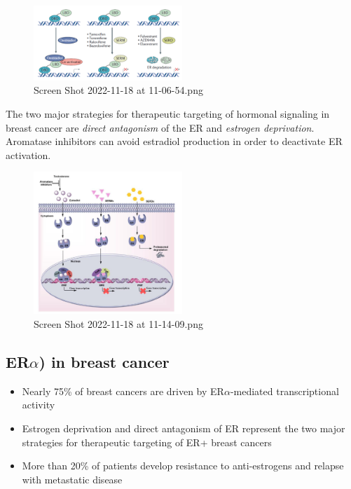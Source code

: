 \begin{figure}
\centering
\includegraphics[width=0.5\textwidth]{../_resources/Screen_Shot_2022-11-18_at_11-06-54.png}
\caption{Screen Shot 2022-11-18 at 11-06-54.png}
\end{figure}

The two major strategies for therapeutic targeting of hormonal signaling in breast cancer are \emph{direct antagonism} of the ER and \emph{estrogen deprivation}. Aromatase inhibitors can avoid estradiol production in order to deactivate ER activation.

\begin{figure}
\centering
\includegraphics[width=0.5\textwidth]{../_resources/Screen_Shot_2022-11-18_at_11-14-09.png}
\caption{Screen Shot 2022-11-18 at 11-14-09.png}
\end{figure}


\subsection{ER$\alpha$) in breast cancer}

\begin{itemize}
\tightlist
\item
  Nearly 75\% of breast cancers are driven by ER$\alpha$-mediated transcriptional activity
\item
  Estrogen deprivation and direct antagonism of ER represent the two major strategies for therapeutic targeting of ER+ breast cancers
\item
  More than 20\% of patients develop resistance to anti-estrogens and relapse with metastatic disease
\end{itemize}

